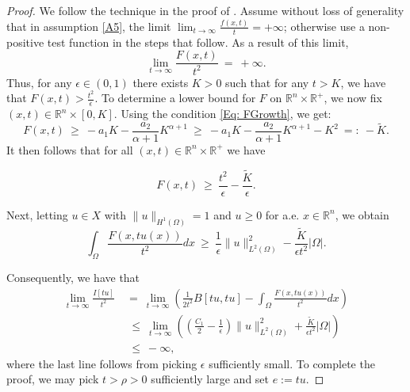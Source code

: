\documentclass[11pt]{amsart}   	%
\theoremstyle{plain}
\numberwithin{equation}{section}
\def\ep{\epsilon}
\def\Om{\Omega}
\def\R{\mathbb{R}}
\def\grad{\nabla}
\def\Lin{\mathcal{L}}
\begin{document}
\begin{proof} We follow the technique in the proof of \cite[Theorem 1.1]{torres2016existence}. Assume without loss of generality that in assumption \ref{A5}, the limit $\lim_{t \rightarrow \infty}\frac{f(x, t)}{t} = +\infty$; otherwise use a non-positive test function in the steps that follow. As a result of this limit,
\begin{equation}\label{Eq: coercivityLemH^1Eq1}
    \lim_{t \rightarrow \infty}\frac{F(x, t)}{t^2} \ = \ +\infty.
\end{equation}
Thus, for any  $\ep\in(0,1)$ there exists $K > 0$ such that for any $t > K$, we have that $F(x, t) > \frac{t^2}{\ep}$. To determine a lower bound for $F$ on $ \R^n \times \R^+$, we now fix $(x,t)\in \R^n \times[0,K]$. Using the condition \eqref{Eq: FGrowth}, we get:
\begin{equation}\label{Eq: FDecay}
F(x,t) \ \geq \ -a_1 K - \frac{a_2}{\alpha+1} K^{\alpha+1} \ \geq \ -a_1 K - \frac{a_2}{\alpha+1} K^{\alpha+1} -K^2 \ =: \ -\tilde{K}.
\end{equation}
It then follows that for all $(x, t) \in \R^n \times \R^+$ we have 

\begin{equation}\label{Eq: FGetsLarge}
F(x, t) \ \geq \ \frac{t^2}{\ep} - \frac{\tilde{K}}{\ep}.
\end{equation}

Next, letting $u \in X$ with $\|u\|_{H^1(\Omega)} = 1$ and $u \geq 0$ for a.e. $ x\in \R^n$, we obtain
\begin{equation}\label{Eq: coercivityLemH^1Eq2}
    \int_{\Omega}\frac{F(x, tu(x))}{t^2}dx \ \geq \ \frac{1}{\ep}\|u\|^2_{L^2(\Omega)} - \frac{\tilde{K}}{\ep t^2}|\Omega|.
\end{equation}

Consequently, we have that
\begin{equation}\label{Eq: coercivityLemH^1Eq4}
\begin{aligned}
    \lim_{t \rightarrow \infty}\frac{I[tu]}{t^2} \ & =  \  \lim_{t \rightarrow \infty}\left( \frac{1}{2t^2} B[tu,tu]
     - \int_{\Om}\frac{F(x, tu(x))}{t^2}dx\right) \\
     & \ \leq \ \lim_{t \rightarrow \infty} \left( \left(\frac{C_1}{2}- \frac{1}{\ep}\right)\|u\|^2_{L^2(\Omega)} + \frac{\tilde{K}}{\ep t^2}|\Omega| \right) \\
     & \ \leq \ - \infty,
     \end{aligned}
\end{equation}
where the last line follows from picking $\ep$ sufficiently small. To complete the proof, we may pick $t > \rho >0$ sufficiently large and set $e := tu$. 
 \end{proof}
 
\end{document}
